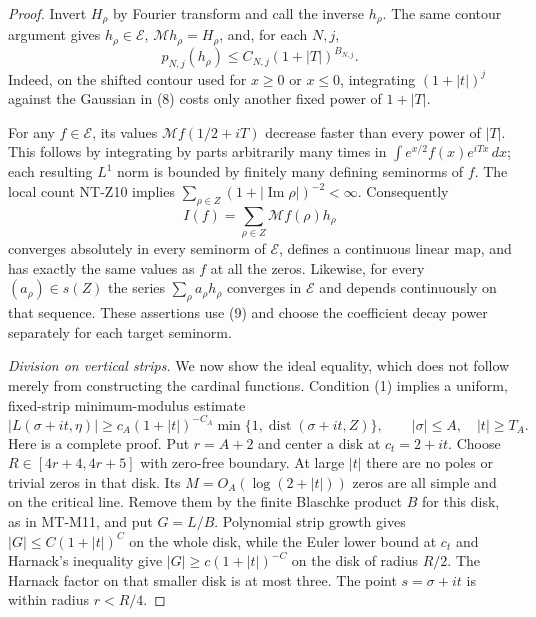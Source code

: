 \begin{proof}
Invert $H_\rho$ by Fourier transform and call the inverse
$h_\rho$. The same contour argument gives $h_\rho\in\mathcal E$,
$\mathcal Mh_\rho=H_\rho$, and, for each $N,j$,
\[
             p_{N,j}(h_\rho)
                    \le C_{N,j}(1+|T|)^{B_{N,j}}.      \tag{9}
\]
Indeed, on the shifted contour used for $x\ge0$ or $x\le0$,
integrating $(1+|t|)^j$ against the Gaussian in (8) costs
only another fixed power of $1+|T|$.

For any $f\in\mathcal E$, its values $\mathcal Mf(1/2+iT)$
decrease faster than every power of $|T|$. This follows by
integrating by parts arbitrarily many times in
$\int e^{x/2}f(x)e^{iTx}\,dx$; each resulting $L^1$ norm
is bounded by finitely many defining seminorms of $f$.
The local count NT-Z10 implies
$\sum_{\rho\in Z}(1+|\operatorname{Im}\rho|)^{-2}<\infty$.
Consequently
\[
              I(f)=\sum_{\rho\in Z}\mathcal Mf(\rho)h_\rho
                                                               \tag{10}
\]
converges absolutely in every seminorm of $\mathcal E$,
defines a continuous linear map, and has exactly the same
values as $f$ at all the zeros. Likewise, for every
$(a_\rho)\in s(Z)$ the series $\sum_\rho a_\rho h_\rho$
converges in $\mathcal E$ and depends continuously on that
sequence. These assertions use (9) and choose the coefficient
decay power separately for each target seminorm.

\emph{Division on vertical strips.}
We now show the ideal equality, which does not follow merely
from constructing the cardinal functions.
Condition (1) implies a uniform, fixed-strip minimum-modulus
estimate
\[
 |L(\sigma+it,\eta)|
   \ge c_A(1+|t|)^{-C_A}
            \min\{1,\operatorname{dist}(\sigma+it,Z)\},
 \qquad |\sigma|\le A,\quad |t|\ge T_A.                 \tag{11}
\]
Here is a complete proof. Put $r=A+2$ and center a disk at
$c_t=2+it$. Choose $R\in[4r+4,4r+5]$ with zero-free boundary.
At large $|t|$ there are no poles or trivial zeros in that disk.
Its $M=O_A(\log(2+|t|))$ zeros are all simple and on the
critical line. Remove them by the finite Blaschke product
$B$ for this disk, as in MT-M11, and put $G=L/B$.
Polynomial strip growth gives $|G|\le C(1+|t|)^C$ on the
whole disk, while the Euler lower bound at $c_t$ and Harnack's
inequality give
$|G|\ge c(1+|t|)^{-C}$ on the disk of radius $R/2$.
The Harnack factor on that smaller disk is at most three.
The point $s=\sigma+it$ is within radius $r<R/4$.


\end{proof}
